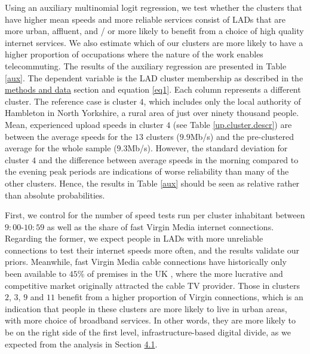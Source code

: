\documentclass[]{interact}
\theoremstyle{plain}%
\theoremstyle{definition}
\theoremstyle{remark}
\begin{document}
Using an auxiliary multinomial logit regression, we test whether the
clusters that have higher mean speeds and more reliable services consist
of LADs that are more urban, affluent, and / or more likely to benefit
from a choice of high quality internet services. We also estimate which
of our clusters are more likely to have a higher proportion of
occupations where the nature of the work enables telecommuting. The
results of the auxiliary regression are presented in Table \ref{aux}.
The dependent variable is the LAD cluster membership as described in the
\protect\hyperlink{sec:3}{methods and data} section and equation
\ref{eq1}. Each column represents a different cluster. The reference
case is cluster \(4\), which includes only the local authority of
Hambleton in North Yorkshire, a rural area of just over ninety thousand
people. Mean, experienced upload speeds in cluster \(4\) (see Table
\ref{up.cluster.descr}) are between the average speeds for the \(13\)
clusters (\(9.9\)Mb/s) and the pre-clustered average for the whole
sample (\(9.3\)Mb/s). However, the standard deviation for cluster \(4\)
and the difference between average speeds in the morning compared to the
evening peak periods are indications of worse reliability than many of
the other clusters. Hence, the results in Table \ref{aux} should be seen
as relative rather than absolute probabilities.

First, we control for the number of speed tests run per cluster
inhabitant between \(9:00\)-\(10:59\) as well as the share of fast
Virgin Media internet connections. Regarding the former, we expect
people in LADs with more unreliable connections to test their internet
speeds more often, and the results validate our priors. Meanwhile, fast
Virgin Media cable connections have historically only been available to
\(45\)\% of premises in the UK \citep{ofcom2016}, where the more
lucrative and competitive market originally attracted the cable TV
provider. Those in clusters \(2\), \(3\), \(9\) and \(11\) benefit from
a higher proportion of Virgin connections, which is an indication that
people in these clusters are more likely to live in urban areas, with
more choice of broadband services. In other words, they are more likely
to be on the right side of the first level, infrastructure-based digital
divide, as we expected from the analysis in Section
\protect\hyperlink{sec:4.1}{4.1}.
\end{document}
